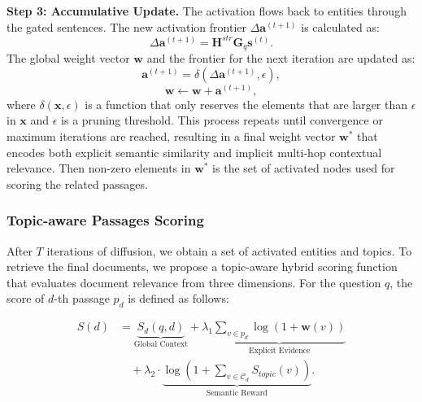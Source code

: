 \textbf{Step 3: Accumulative Update.} The activation flows back to entities through the gated sentences. The new activation frontier $\Delta \mathbf{a}^{(t+1)}$ is calculated as:
\begin{equation}
    \Delta \mathbf{a}^{(t+1)} = \mathbf{H}^{str} \mathbf{G}_q \mathbf{s}^{(t)}.
\end{equation}
The global weight vector $\mathbf{w}$ and the frontier for the next iteration are updated as:
\begin{equation}
    \mathbf{a}^{(t+1)} = \delta(\Delta \mathbf{a}^{(t+1)}, \epsilon),
\end{equation}
\begin{equation}
    \mathbf{w} \leftarrow \mathbf{w} + \mathbf{a}^{(t+1)},
\end{equation}
where $\delta(\mathbf{x}, \epsilon)$ is a function that only reserves the elements that are larger than $\epsilon$ in $\mathbf{x}$ and $\epsilon$ is a pruning threshold. This process repeats until convergence or maximum iterations are reached, resulting in a final weight vector $\mathbf{w}^*$ that encodes both explicit semantic similarity and implicit multi-hop contextual relevance. Then non-zero elements in $\mathbf{w}^*$ is the set of activated nodes used for scoring the related passages.

\subsubsection{Topic-aware Passages Scoring}
After $T$ iterations of diffusion, we obtain a set of activated entities and topics. To retrieve the final documents, we propose a topic-aware hybrid scoring function that evaluates document relevance from three dimensions. For the question $q$, the score of $d$-th passage $p_d$ is defined as follows:

\begin{equation}
\begin{split}
    S(d) &= \underbrace{S_{d}(q, d)}_{\text{Global Context}} + \lambda_1 \underbrace{\sum_{v \in p_d} \log(1 + \mathbf{w}(v))}_{\text{Explicit Evidence}} \\
    &\quad + \lambda_2 \cdot\underbrace{ \log(1 + \sum_{v \in \mathcal{C}_d}S_{topic}(v))}_{\text{Semantic Reward}}.
\end{split}
\end{equation}

